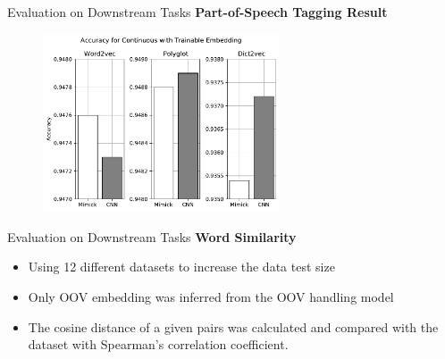 \documentclass{beamer}
\begin{document}
\begin{frame}{Evaluation on Downstream Tasks}
    \textbf{Part-of-Speech Tagging Result}
    \begin{figure}[H]
        \centering
        \includegraphics[width=70mm]{images/train_embed}
    \end{figure}
\end{frame}
\begin{frame}{Evaluation on Downstream Tasks}
    \textbf{Word Similarity}
    \begin{itemize}
        \item Using 12 different datasets to increase the data test size
        \item Only OOV embedding was inferred from the OOV handling model
        \item The cosine distance of a given pairs was calculated and
        compared with the dataset with Spearman's correlation
        coefficient.
    \end{itemize}
\end{frame}
\end{document}
